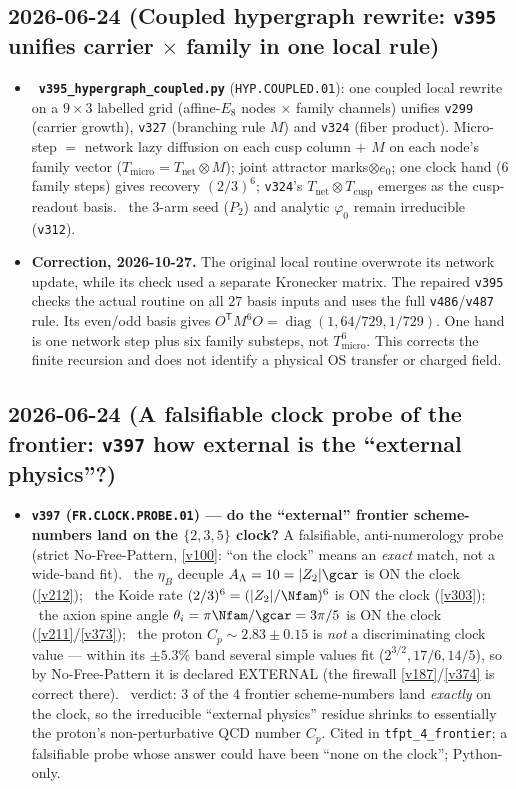 \subsection*{2026-06-24 (Coupled hypergraph rewrite: \texttt{v395} unifies carrier $\times$ family in one local rule)}
\begin{itemize}
  \item \mE\ \textbf{\texttt{v395\_hypergraph\_coupled.py}} (\texttt{HYP.COUPLED.01}): one coupled local rewrite on a $9\times3$ labelled grid (affine-$E_8$ nodes $\times$ family channels) unifies \texttt{v299} (carrier growth), \texttt{v327} (branching rule $M$) and \texttt{v324} (fiber product). Micro-step $=$ network lazy diffusion on each cusp column $+$ $M$ on each node's family vector ($T_{\mathrm{micro}}=T_{\mathrm{net}}\otimes M$); joint attractor marks$\otimes e_0$; one clock hand ($6$ family steps) gives recovery $(2/3)^6$; \texttt{v324}'s $T_{\mathrm{net}}\otimes T_{\mathrm{cusp}}$ emerges as the cusp-readout basis. \mO\ the $3$-arm seed ($P_2$) and analytic $\varphi_0$ remain irreducible (\texttt{v312}).
  \item \textbf{Correction, 2026-10-27.} The original local routine overwrote its network update, while its check used a separate Kronecker matrix. The repaired \texttt{v395} checks the actual routine on all $27$ basis inputs and uses the full \texttt{v486}/\texttt{v487} rule. Its even/odd basis gives $O^{\mathsf T}M^6O=\operatorname{diag}(1,64/729,1/729)$. One hand is one network step plus six family substeps, not $T_{\mathrm{micro}}^6$. This corrects the finite recursion and does not identify a physical OS transfer or charged field.
\end{itemize}

\subsection*{2026-06-24 (A falsifiable clock probe of the frontier: \texttt{v397} how external is the ``external physics''?)}
\begin{itemize}
\item \textbf{\texttt{v397} (\texttt{FR.CLOCK.PROBE.01}) --- do the ``external'' frontier scheme-numbers land on the
$\{2,3,5\}$ clock?} A falsifiable, anti-numerology probe (strict No-Free-Pattern, \vref{v100}: ``on the clock'' means
an \emph{exact} match, not a wide-band fit). \mE\ the $\eta_B$ decuple $A_\Lambda=10=|Z_2|\gcar$ is ON the clock
(\vref{v212}); \mE\ the Koide rate $(2/3)^6=(|Z_2|/\Nfam)^6$ is ON the clock (\vref{v303}); \mE\ the axion spine angle
$\theta_i=\pi\Nfam/\gcar=3\pi/5$ is ON the clock (\vref{v211}/\vref{v373}); \mE\ the proton $C_p\sim2.83\pm0.15$ is
\emph{not} a discriminating clock value --- within its $\pm5.3\%$ band several simple values fit
($2^{3/2},17/6,14/5$), so by No-Free-Pattern it is declared EXTERNAL (the firewall \vref{v187}/\vref{v374} is correct
there). \mC\ verdict: $3$ of the $4$ frontier scheme-numbers land \emph{exactly} on the clock, so the irreducible
``external physics'' residue shrinks to essentially the proton's non-perturbative QCD number $C_p$. Cited in
\texttt{tfpt\_4\_frontier}; a falsifiable probe whose answer could have been ``none on the clock''; Python-only.
\end{itemize}

